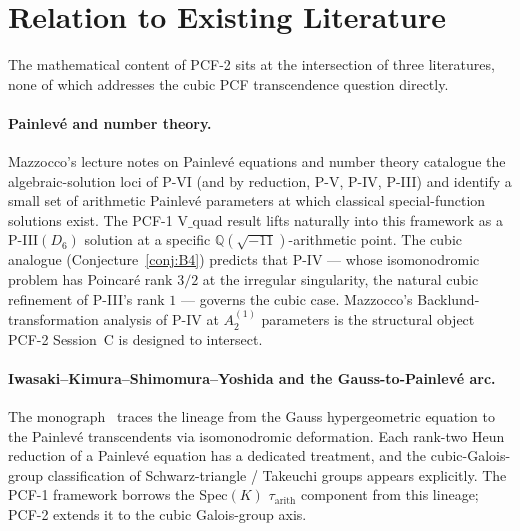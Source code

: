 \documentclass[11pt,a4paper]{article}
\theoremstyle{definition}
\theoremstyle{remark}
\newcommand{\Q}{\mathbb{Q}}
\begin{document}
\section{Relation to Existing Literature}\label{sec:litrel}

The mathematical content of PCF-2 sits at the intersection of three
literatures, none of which addresses the cubic PCF transcendence
question directly.

\paragraph{Painlev\'e and number theory.}
Mazzocco's lecture notes on Painlev\'e equations and number theory
\cite{Mazzocco2003} catalogue the algebraic-solution loci of P-VI
(and by reduction, P-V, P-IV, P-III) and identify a small set of
arithmetic Painlev\'e parameters at which classical special-function
solutions exist. The PCF-1 V$\_$quad result lifts naturally into
this framework as a P-III$(D_{6})$ solution at a specific
$\Q(\sqrt{-11})$-arithmetic point. The cubic analogue
(Conjecture~\ref{conj:B4}) predicts that P-IV --- whose isomonodromic
problem has Poincar\'e rank $3/2$ at the irregular singularity, the
natural cubic refinement of P-III's rank $1$ --- governs the cubic
case. Mazzocco's Backlund-transformation analysis of P-IV at $A_{2}^{(1)}$
parameters is the structural object PCF-2 Session~C is designed to
intersect.

\paragraph{Iwasaki--Kimura--Shimomura--Yoshida and the Gauss-to-Painlev\'e
arc.}
The monograph~\cite{Iwasaki1991} traces the lineage from the
Gauss hypergeometric equation to the Painlev\'e transcendents via
isomonodromic deformation. Each rank-two Heun reduction of a Painlev\'e
equation has a dedicated treatment, and the cubic-Galois-group
classification of Schwarz-triangle / Takeuchi groups
appears explicitly. The PCF-1 framework borrows the Spec$(K)$
$\tau_{\mathrm{arith}}$ component from this lineage; PCF-2 extends it to
the cubic Galois-group axis.
\end{document}
